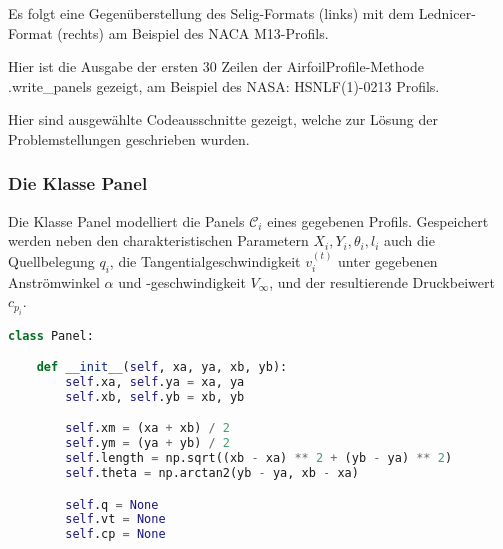 \appendix

\label{appendix:a}

Es folgt eine Gegenüberstellung des Selig-Formats (links) mit dem Lednicer-Format (rechts) am Beispiel des NACA M13-Profils.

\begin{minipage}{0.45\textwidth}

\end{minipage}
    \hfill
\begin{minipage}{0.45\textwidth}

\end{minipage}

\newpage
{}
\label{appendix:b}
Hier ist die Ausgabe der ersten 30 Zeilen der AirfoilProfile-Methode .write\_panels gezeigt, am Beispiel des NASA: HSNLF(1)-0213 Profils.



\newpage
{}
\label{appendix:c}
Hier sind ausgewählte Codeausschnitte gezeigt, welche zur Lösung der Problemstellungen geschrieben wurden.
\subsubsection{Die Klasse Panel}
Die Klasse Panel modelliert die Panels $\mathcal{C}_i$ eines gegebenen Profils. Gespeichert werden neben den charakteristischen Parametern $X_i, Y_i, \theta _i, l_i$ auch die Quellbelegung $q_i$, die Tangentialgeschwindigkeit $v_i^{(t)}$ unter gegebenen Anströmwinkel $\alpha $ und -geschwindigkeit $V_{\infty}$, und der resultierende Druckbeiwert $c_{p_i}$.
\begin{lstlisting}[language=Python]
class Panel:

    def __init__(self, xa, ya, xb, yb):
        self.xa, self.ya = xa, ya
        self.xb, self.yb = xb, yb

        self.xm = (xa + xb) / 2
        self.ym = (ya + yb) / 2
        self.length = np.sqrt((xb - xa) ** 2 + (yb - ya) ** 2)
        self.theta = np.arctan2(yb - ya, xb - xa)

        self.q = None
        self.vt = None
        self.cp = None
\end{lstlisting}

